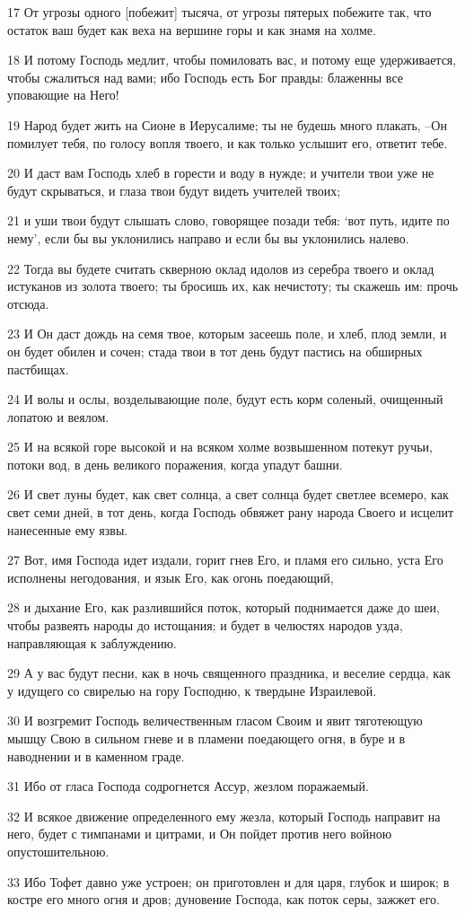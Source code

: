 \par 17 От угрозы одного [побежит] тысяча, от угрозы пятерых побежите так, что остаток ваш будет как веха на вершине горы и как знамя на холме.
\par 18 И потому Господь медлит, чтобы помиловать вас, и потому еще удерживается, чтобы сжалиться над вами; ибо Господь есть Бог правды: блаженны все уповающие на Него!
\par 19 Народ будет жить на Сионе в Иерусалиме; ты не будешь много плакать, --Он помилует тебя, по голосу вопля твоего, и как только услышит его, ответит тебе.
\par 20 И даст вам Господь хлеб в горести и воду в нужде; и учители твои уже не будут скрываться, и глаза твои будут видеть учителей твоих;
\par 21 и уши твои будут слышать слово, говорящее позади тебя: `вот путь, идите по нему', если бы вы уклонились направо и если бы вы уклонились налево.
\par 22 Тогда вы будете считать скверною оклад идолов из серебра твоего и оклад истуканов из золота твоего; ты бросишь их, как нечистоту; ты скажешь им: прочь отсюда.
\par 23 И Он даст дождь на семя твое, которым засеешь поле, и хлеб, плод земли, и он будет обилен и сочен; стада твои в тот день будут пастись на обширных пастбищах.
\par 24 И волы и ослы, возделывающие поле, будут есть корм соленый, очищенный лопатою и веялом.
\par 25 И на всякой горе высокой и на всяком холме возвышенном потекут ручьи, потоки вод, в день великого поражения, когда упадут башни.
\par 26 И свет луны будет, как свет солнца, а свет солнца будет светлее всемеро, как свет семи дней, в тот день, когда Господь обвяжет рану народа Своего и исцелит нанесенные ему язвы.
\par 27 Вот, имя Господа идет издали, горит гнев Его, и пламя его сильно, уста Его исполнены негодования, и язык Его, как огонь поедающий,
\par 28 и дыхание Его, как разлившийся поток, который поднимается даже до шеи, чтобы развеять народы до истощания; и будет в челюстях народов узда, направляющая к заблуждению.
\par 29 А у вас будут песни, как в ночь священного праздника, и веселие сердца, как у идущего со свирелью на гору Господню, к твердыне Израилевой.
\par 30 И возгремит Господь величественным гласом Своим и явит тяготеющую мышцу Свою в сильном гневе и в пламени поедающего огня, в буре и в наводнении и в каменном граде.
\par 31 Ибо от гласа Господа содрогнется Ассур, жезлом поражаемый.
\par 32 И всякое движение определенного ему жезла, который Господь направит на него, будет с тимпанами и цитрами, и Он пойдет против него войною опустошительною.
\par 33 Ибо Тофет давно уже устроен; он приготовлен и для царя, глубок и широк; в костре его много огня и дров; дуновение Господа, как поток серы, зажжет его.

